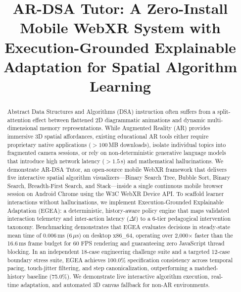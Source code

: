 \documentclass[conference]{IEEEtran}
\begin{document}
\title{AR-DSA Tutor: A Zero-Install Mobile WebXR System with Execution-Grounded Explainable Adaptation for Spatial Algorithm Learning}

\author{
}

\maketitle

\begin{abstract}
Abstract Data Structures and Algorithms (DSA) instruction often suffers from a split-attention effect between flattened 2D diagrammatic animations and dynamic multi-dimensional memory representations. While Augmented Reality (AR) provides immersive 3D spatial affordances, existing educational AR tools either require proprietary native applications ($> 100$\,MB downloads), isolate individual topics into fragmented camera sessions, or rely on non-deterministic generative language models that introduce high network latency ($> 1.5$\,s) and mathematical hallucinations. We demonstrate AR-DSA Tutor, an open-source mobile WebXR framework that delivers five interactive spatial algorithm visualizers---Binary Search Tree, Bubble Sort, Binary Search, Breadth-First Search, and Stack---inside a single continuous mobile browser session on Android Chrome using the W3C WebXR Device API. To scaffold learner interactions without hallucinations, we implement Execution-Grounded Explainable Adaptation (EGEA): a deterministic, history-aware policy engine that maps validated interaction telemetry and inter-action latency ($\Delta t$) to a 6-tier pedagogical intervention taxonomy. Benchmarking demonstrates that EGEA evaluates decisions in steady-state mean time of 0.006\,ms ($6\,\mu$s) on desktop x86\_64, operating over 2,000$\times$ faster than the 16.6\,ms frame budget for 60 FPS rendering and guaranteeing zero JavaScript thread blocking. In an independent 18-case engineering challenge suite and a targeted 12-case boundary stress suite, EGEA achieves 100.0\% specification consistency across temporal pacing, touch-jitter filtering, and step canonicalization, outperforming a matched-history baseline (75.0\%). We demonstrate live interactive algorithm execution, real-time adaptation, and automated 3D canvas fallback for non-AR environments.
\end{abstract}
\end{document}
